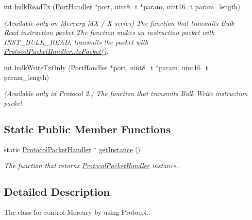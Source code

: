 \begin{DoxyCompactItemize}
int \hyperlink{classmercury_1_1_protocol_packet_handler_a81f298b0d67e9c578a3b2b839f90b378}{bulk\+Read\+Tx} (\hyperlink{classmercury_1_1_port_handler}{Port\+Handler} $\ast$port, uint8\+\_\+t $\ast$param, uint16\+\_\+t param\+\_\+length)
\begin{DoxyCompactList}\small\item\em (Available only on Mercury MX / X series) The function that transmits Bulk Read instruction packet  The function makes an instruction packet with I\+N\+S\+T\+\_\+\+B\+U\+L\+K\+\_\+\+R\+E\+AD,  transmits the packet with \hyperlink{classmercury_1_1_protocol_packet_handler_a245f01395d9684bc58788e8a06de3ffc}{Protocol\+Packet\+Handler\+::tx\+Packet()}. \end{DoxyCompactList}\item 
int \hyperlink{classmercury_1_1_protocol_packet_handler_ac6c15829fd1bd0e321a1d63076e11839}{bulk\+Write\+Tx\+Only} (\hyperlink{classmercury_1_1_port_handler}{Port\+Handler} $\ast$port, uint8\+\_\+t $\ast$param, uint16\+\_\+t param\+\_\+length)
\begin{DoxyCompactList}\small\item\em (Available only in Protocol 2.) The function that transmits Bulk Write instruction packet \end{DoxyCompactList}\end{DoxyCompactItemize}
\subsection*{Static Public Member Functions}
\begin{DoxyCompactItemize}
\item 
static \hyperlink{classmercury_1_1_protocol_packet_handler}{Protocol\+Packet\+Handler} $\ast$ \hyperlink{classmercury_1_1_protocol_packet_handler_a0de2b506e22d7673b1e5c83ddc507a74}{get\+Instance} ()
\begin{DoxyCompactList}\small\item\em The function that returns \hyperlink{classmercury_1_1_protocol_packet_handler}{Protocol\+Packet\+Handler} instance. \end{DoxyCompactList}\end{DoxyCompactItemize}


\subsection{Detailed Description}
The class for control Mercury by using Protocol.. 

